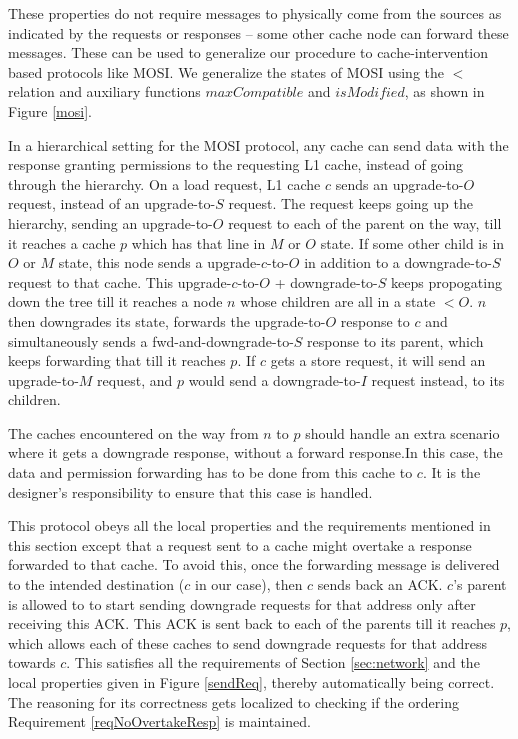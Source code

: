 These properties do not require messages to physically come from the sources as
indicated by the requests or responses -- some other cache node can forward
these messages. These can be used to generalize our procedure to
cache-intervention based protocols like MOSI. We generalize the states of MOSI
using the $<$ relation and auxiliary functions $maxCompatible$ and $isModified$,
as shown in Figure \ref{mosi}. 

In a hierarchical setting for the MOSI protocol, any cache can send data
with the response granting permissions to the requesting L1 cache, instead of
going through the hierarchy.  On a load request, L1 cache $c$ sends an
upgrade-to-$O$ request, instead of an upgrade-to-$S$ request. The request keeps
going up the hierarchy, sending an upgrade-to-$O$ request to each of the parent
on the way, till it reaches a cache $p$ which has that line in $M$ or $O$
state. If some other child is in $O$ or $M$ state, this node sends a
upgrade-$c$-to-$O$ in addition to a downgrade-to-$S$ request to that cache.
This upgrade-$c$-to-$O$ + downgrade-to-$S$ keeps propogating down the tree till
it reaches a node $n$ whose children are all in a state $< O$. $n$ then
downgrades its state, forwards the upgrade-to-$O$ response to $c$ and
simultaneously sends a fwd-and-downgrade-to-$S$ response to its parent, which
keeps forwarding that till it reaches $p$. If $c$ gets a store request, it will
send an upgrade-to-$M$ request, and $p$ would send a downgrade-to-$I$ request
instead, to its children.

The caches encountered on the way from $n$ to $p$ should handle an extra
scenario where it gets a downgrade response, without a forward response.In this
case, the data and permission forwarding has to be done from this cache to $c$.
It is the designer's responsibility to ensure that this case is handled. 

This protocol obeys all the local properties and the requirements mentioned in
this section except that a request sent to a cache might overtake a response
forwarded to that cache. To avoid this, once the forwarding message is
delivered to the intended destination ($c$ in our case), then $c$ sends back an
ACK. $c$'s parent is allowed to to start sending downgrade requests for that
address only after receiving this ACK. This ACK is sent back to each of the
parents till it reaches $p$, which allows each of these caches to send
downgrade requests for that address towards $c$.  This satisfies all the
requirements of Section \ref{sec:network} and the local properties given in
Figure \ref{sendReq}, thereby automatically being correct. The reasoning for
its correctness gets localized to checking if the ordering Requirement
\ref{reqNoOvertakeResp} is maintained.
